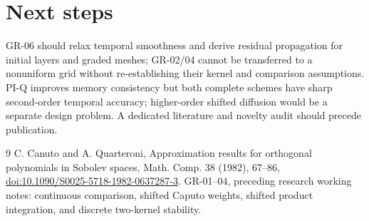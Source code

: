 \documentclass[11pt,a4paper]{article}
\begin{document}
\section{Next steps}
GR-06 should relax temporal smoothness and derive residual propagation for initial layers and graded meshes; GR-02/04 cannot be transferred to a nonuniform grid without re-establishing their kernel and comparison assumptions. PI-Q improves memory consistency but both complete schemes have sharp second-order temporal accuracy; higher-order shifted diffusion would be a separate design problem. A dedicated literature and novelty audit should precede publication.
\begin{thebibliography}{9}
 C. Canuto and A. Quarteroni, Approximation results for orthogonal polynomials in Sobolev spaces, Math. Comp. 38 (1982), 67--86, \href{https://doi.org/10.1090/S0025-5718-1982-0637287-3}{doi:10.1090/S0025-5718-1982-0637287-3}.
 GR-01--04, preceding research working notes: continuous comparison, shifted Caputo weights, shifted product integration, and discrete two-kernel stability.
\end{thebibliography}
\end{document}
